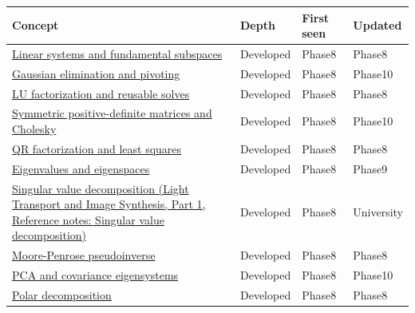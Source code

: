 {\def\LTcaptype{none} %
\begin{longtable}[]{@{}
  >{\raggedright\arraybackslash}p{}
  >{\raggedright\arraybackslash}p{}
  >{\raggedright\arraybackslash}p{}
  >{\raggedright\arraybackslash}p{}@{}}
\toprule\noalign{}
\begin{minipage}[b]{\linewidth}\raggedright
Concept
\end{minipage} & \begin{minipage}[b]{\linewidth}\raggedright
Depth
\end{minipage} & \begin{minipage}[b]{\linewidth}\raggedright
First seen
\end{minipage} & \begin{minipage}[b]{\linewidth}\raggedright
Updated
\end{minipage} \\
\midrule\noalign{}
\endhead
\bottomrule\noalign{}
\endlastfoot
\hyperref[appendix-8572a4a060c1]{Linear systems and fundamental subspaces} & Developed & Phase8 & Phase8 \\
\hyperref[appendix-f6e77f4a200f]{Gaussian elimination and pivoting} & Developed & Phase8 & Phase10 \\
\hyperref[appendix-55e4b5b0a1e6]{LU factorization and reusable solves} & Developed & Phase8 & Phase8 \\
\hyperref[appendix-50d2ea3c9b26]{Symmetric positive-definite matrices and Cholesky} & Developed & Phase8 & Phase10 \\
\hyperref[appendix-c3421e6b4f2c]{QR factorization and least squares} & Developed & Phase8 & Phase8 \\
\hyperref[appendix-0b3be18411f9]{Eigenvalues and eigenspaces} & Developed & Phase8 & Phase9 \\
\href{../04-Light-Transport-and-Image-Synthesis-P01/main.pdf\#appendix-1fad5e7f36fa}{Singular value decomposition (Light Transport and Image Synthesis, Part 1, Reference notes: Singular value decomposition)} & Developed & Phase8 & University \\
\hyperref[appendix-541306fdbc1b]{Moore-Penrose pseudoinverse} & Developed & Phase8 & Phase8 \\
\hyperref[appendix-ad175ef3c5bf]{PCA and covariance eigensystems} & Developed & Phase8 & Phase10 \\
\hyperref[appendix-73f5bcf7a462]{Polar decomposition} & Developed & Phase8 & Phase8 \\

\end{longtable}}
